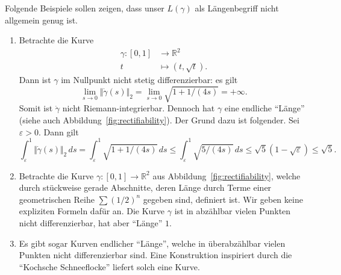 \documentclass[../main.tex]{subfiles}
\begin{document}
\begin{examples}
  Folgende Beispiele sollen zeigen, dass
  unser $L(\gamma)$ als Längenbegriff nicht
  allgemein genug ist.
  \begin{enumerate}[(1)]
    \item Betrachte die Kurve
      \begin{align*}
        \gamma \colon [0, 1] & \to \mathbb{R}^2 \\
        t & \mapsto (t, \sqrt{t}).
      \end{align*}
      Dann ist $\gamma$ 
      im Nullpunkt nicht stetig
      differenzierbar: es gilt
      \[
        \lim_{s \to 0}
        \Vert \dot \gamma(s) \Vert_2
        = \lim_{s \to 0}
        \sqrt{1 + 1/(4s)} = +\infty.
      \]
      Somit ist $\dot \gamma$ 
      nicht Riemann-integrierbar.
      Dennoch hat $\gamma$ eine
      endliche ``Länge'' (siehe auch
      Abbildung~\ref{fig:rectifiability}).
      Der Grund dazu ist folgender.
      Sei $\varepsilon > 0$.
      Dann gilt
      \[
        \int_{\varepsilon}^{1} 
        \Vert \dot \gamma(s) \Vert_2\, ds
        =
        \int_{\varepsilon}^{1} 
        \sqrt{1 + 1/(4s)} \, ds
        \leq \int_{\varepsilon}^{1} 
        \sqrt{5/(4s)} \, ds
        \leq \sqrt 5 (1 - \sqrt{\varepsilon})
        \leq \sqrt 5.
      \]
    \item Betrachte die Kurve $\gamma \colon [0, 1] \to \mathbb{R}^2$ 
      aus Abbildung~\ref{fig:rectifiability},
      welche durch stückweise gerade Abschnitte,
      deren Länge durch Terme einer geometrischen
      Reihe $\sum {(1/2)}^n$ gegeben sind, definiert ist.
      Wir geben keine expliziten Formeln dafür an.
      Die Kurve $\gamma$ ist in abzählbar vielen
      Punkten nicht differenzierbar,
      hat aber ``Länge'' $1$.
    \item Es gibt sogar Kurven endlicher ``Länge'',
      welche in überabzählbar vielen Punkten nicht
      differenzierbar sind.
      Eine Konstruktion inspiriert durch
      die ``Kochsche Schneeflocke'' liefert
      solch eine Kurve.
  \end{enumerate}
\end{examples}
\end{document}
